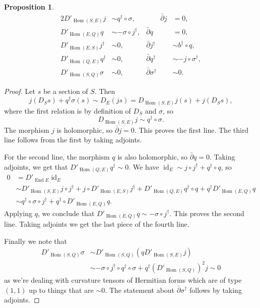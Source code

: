 \documentclass[10pt,a4paper]{amsart}
\newtheorem{prop}[theo]{Proposition}
\theoremstyle{definition}
\DeclareMathOperator{\End}{End}
\DeclareMathOperator{\Hom}{Hom}
\DeclareMathOperator{\id}{id}
\def\snd{\sigma}
\begin{document}
\begin{prop}
\label{prop:seq-formulas}
\begin{alignat*}{2}
D'_{\Hom(S,E)}j &\sim q^\dagger \circ \snd,
&
\qquad
\bar\partial j &= 0,
\\
D'_{\Hom(E, Q)} q &\sim - \snd \circ j^\dagger,
&
\bar\partial q &= 0,
\\
D'_{\Hom(E,S)} j^\dagger &\sim 0,
&
\bar\partial j^\dagger &\sim b^\dagger \circ q,
\\
D'_{\Hom(Q,E)} q^\dagger &\sim 0,
&
\bar\partial q^\dagger &\sim - j \circ \snd^\dagger,
\\
D'_{\Hom(S,Q)} \snd &\sim 0,
&
\bar\partial \snd^\dagger &\sim 0.
\end{alignat*}
\end{prop}

\begin{proof}
Let $s$ be a section of $S$. Then
\[
j(D_S s) + q^\dagger \snd(s)
\sim D_E(js)
= D_{\Hom(S,E)}j (s) + j(D_S s),
\]
where the first relation is by definition of $D_S$ and $\snd$, so
\[
D_{\Hom(S,E)}j \sim q^\dagger \circ \snd.
\]
The morphism $j$ is holomorphic, so $\bar\partial j = 0$. This proves the first line. The third line follows from the first by taking adjoints.


For the second line, the morphism $q$ is also holomorphic, so $\bar\partial q = 0$. Taking adjoints, we get that $D'_{\Hom(Q,E)} q^\dagger \sim 0$.
We have $\id_E \sim j \circ j^\dagger + q^\dagger \circ q$, so
\begin{align*}
0
&= D'_{\End E} \id_E
\\
&\sim D'_{\Hom(S,E)} j \circ j^\dagger + j \circ D'_{\Hom(E,S)}j^\dagger
+ D'_{\Hom(Q,E)}q^\dagger \circ q + q^\dagger D'_{\Hom(E,Q)} q
\\
&\sim q^\dagger \circ \snd \circ j^\dagger + q^\dagger \circ D'_{\Hom(E,Q)}q.
\end{align*}
Applying $q$, we conclude that $D'_{\Hom(E,Q)}q \sim - \snd \circ j^\dagger$. This proves the second line. Taking adjoints we get the last piece of the fourth line.

Finally we note that
\begin{align*}
D'_{\Hom(S,Q)} \snd
&\sim D'_{\Hom(S,Q)} (q D'_{\Hom(S,E)}j)
\\
&\sim - \snd \circ j^\dagger \circ q^\dagger \circ \snd
+ q^\dagger (D'_{\Hom(S,Q)})^2 j
\sim 0
\end{align*}
as we're dealing with curvature tensors of Hermitian forms which are of type $(1,1)$ up to things that are $\sim 0$. The statement about $\bar\partial \snd^\dagger$ follows by taking adjoints.
\end{proof}
\end{document}
